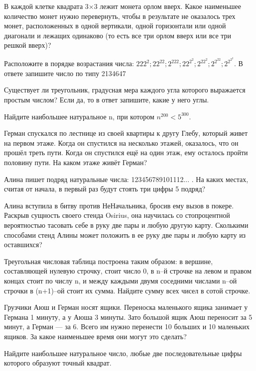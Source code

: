 В каждой клетке квадрата 3×3 лежит монета орлом вверх. Какое наименьшее количество монет нужно перевернуть, чтобы в результате не оказалось трех монет, расположенных в одной вертикали, одной горизонтали или одной диагонали и лежащих одинаково (то есть все три орлом вверх или все три решкой вверх)?

Расположите в порядке возрастания числа: $222^2; 22^{22}; 2^{222}; 22^{2^{2}}; 2^{22^2}; 2^{2^{22}}; 2^{2^{2^2}}$. В ответе запишите число по типу 2134647


Существует ли треугольник, градусная мера каждого угла которого выражается простым числом? Если да, то в ответ запишите, какие у него углы.

Найдите наибольшее натуральное n, при котором  $n^{200} < 5^{300}$.

Герман спускался по лестнице из своей квартиры к другу Глебу, который живет на первом этаже. Когда он спустился на несколько этажей, оказалось, что он прошёл треть пути. Когда он спустился ещё на один этаж, ему осталось пройти половину пути. На каком этаже живёт Герман?

Алина пишет подряд натуральные числа: 123456789101112... .
На каких местах, считая от начала, в первый раз будут стоять три цифры 5 подряд?

Алина вступила в битву против НеНачальника, бросив ему вызов в покере. Раскрыв сущность своего стенда Osirius, она научилась со стопроцентной вероятностью тасовать себе в руку две пары и любую другую карту. Сколькими способами стенд Алины может положить в ее руку две пары и любую карту из оставшихся?

Треугольная числовая таблица построена таким образом: в вершине, составляющей нулевую строчку, стоит число 0, в n–й строчке на левом и правом концах стоит по числу n, и между каждыми двумя соседними числами n–ой строчки в (n+1)–ой стоит их сумма. Найдите сумму всех чисел в сотой строчке.

Грузчики Аюш и Герман носят ящики. Переноска маленького ящика занимает у Германа 1 минуту, а у Аюша 3 минуты. Зато большой ящик Аюш переносит за 5 минут, а Герман — за 6. Всего им нужно перенести 10 больших и 10 маленьких ящиков. За какое наименьшее время они могут это сделать?

Найдите наибольшее натуральное число, любые две последовательные цифры которого образуют точный квадрат.

